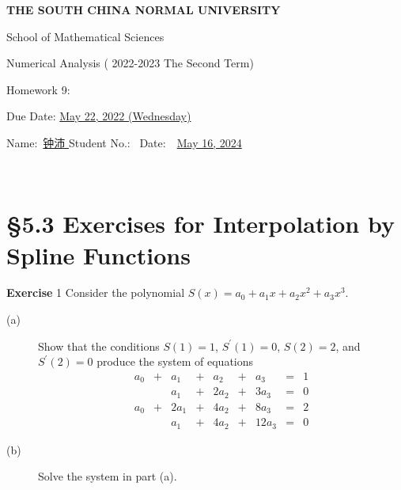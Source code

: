 \documentclass[UTF8,12pt,hyperref]{ctexart}
\makeatletter
\newenvironment{exercise}[1][{\color{blue}\bf Exercise}]%
{%
 \begin{center}   \begin{lrbox}{\@tempboxa}%
    \begin{minipage}{\textwidth}%
  {\color{blue}\bfseries
#1}   }{%
    \end{minipage}%
    \end{lrbox}
    \colorbox{green}{\noindent\usebox{\@tempboxa}} \end{center}  
}
\makeatother
\begin{document}

\begin{center}
{\bf  THE SOUTH CHINA NORMAL UNIVERSITY\vspace{0.08cm}

School of Mathematical Sciences\vspace{0.08cm}
 
Numerical Analysis ( 2022-2023 The Second Term) \vspace{0.18cm}

{\Large Homework 9: }\vspace{0.18cm}

Due Date: \underline{May 22, 2022 (Wednesday)} }
\end{center}\vspace{-0.16cm}

\begin{center}
   Name:\ \underline{\qquad 钟沛 \hspace{1cm}}\hspace{0.298cm}  
   Student No.:\ \underline{\hspace{1cm}} 
Date:\ \ \underline{May 16, 2024} 
 \end{center}
 
 
 

 
  



\section*{\S 5.3 Exercises for Interpolation by Spline Functions}

\begin{exercise} 1     \quad  %
 Consider the polynomial $S(x)=a_0 + a_1x + a_2x^2 + a_3x^3$.
\begin{description}
\item[(a)] Show that the conditions $S(1)=1$, $S^{\prime}(1)=0$, $S(2) =2$, and $S^{\prime}(2)=0$ produce the system of equations
$$
\begin{array}{rcrcrcrcr}
a_0 & + & a_1   &+ & a_2 & +  & a_3 &=&1   \\
        &    & a_1 & + & 2a_2 &+  & 3a_3 &=&0  \\
a_0 & + & 2a_1 &+ & 4a_2& + & 8a_3 &=&2  \\
        &    & a_1& +  & 4a_2 &+ & 12a_3 &=&0
\end{array}
$$

\item[(b)] Solve the system in part (a).
\end{description}
\end{exercise}
\end{document}

